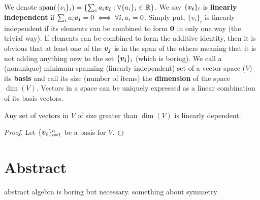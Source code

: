 \begin{definition}
    We denote $\mathrm{span}(\{v_i\}_i)=\{\sum_{i}a_i\boldsymbol{v_i}: \forall\{a_i\}_i\in\mathbb{R}\}$. We say $\{\boldsymbol{v_i}\}_{i}$ is \textbf{linearly independent} if $\sum_{i} a_i\boldsymbol{v_i}=0\iff \forall i,a_i=0$. Simply put, $\{v_i\}_i$ is linearly independent if its elements can be combined to form $\boldsymbol{0}$ in only one way (the trivial way). If elements can be combined to form the additive identity, then it is obvious that at least one of the $\boldsymbol{v_j}$ is in the span of the others meaning that it is not adding anything new to the set $\{\boldsymbol{v_i}\}_i$ (which is boring). We call a (nonunique) minimum spanning (linearly independent) set of a vector space ($V$) its \textbf{basis} and call its size (number of items) the \textbf{dimension} of the space $\dim(V)$. Vectors in a space can be uniquely expressed as a linear combination of its basis vectors.
\end{definition}

\begin{theorem}
    Any set of vectors in $V$ of size greater than $\dim(V)$ is linearly dependent.
\end{theorem}
\begin{proof}
    Let $\{\boldsymbol{v_i}\}_{i=1}^n$ be a basis for $V$.
\end{proof}


\section{Abstract}

abstract algebra is boring but necessary. something about symmetry